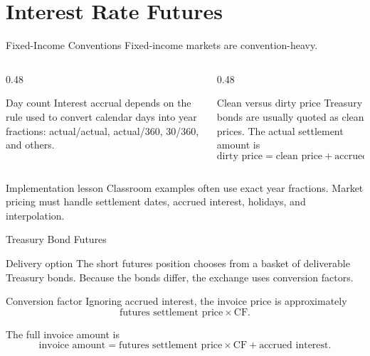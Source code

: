 \documentclass[aspectratio=169,11pt]{beamer}
\newcommand{\CF}{\mathrm{CF}}
\begin{document}
\section{Interest Rate Futures}

\begin{frame}{Fixed-Income Conventions}
    Fixed-income markets are convention-heavy.

    \begin{columns}[T]
        \begin{column}{0.48\textwidth}
            \begin{block}{Day count}
                Interest accrual depends on the rule used to convert calendar days into year fractions:
                actual/actual, actual/360, 30/360, and others.
            \end{block}
        \end{column}
        \begin{column}{0.48\textwidth}
            \begin{block}{Clean versus dirty price}
                Treasury bonds are usually quoted as clean prices.
                The actual settlement amount is
                \[
                    \text{dirty price}=\text{clean price}+\text{accrued interest}.
                \]
            \end{block}
        \end{column}
    \end{columns}

    \begin{alertblock}{Implementation lesson}
        Classroom examples often use exact year fractions. Market pricing must handle settlement dates, accrued interest, holidays, and interpolation.
    \end{alertblock}
\end{frame}

\begin{frame}{Treasury Bond Futures}
    \begin{block}{Delivery option}
        The short futures position chooses from a basket of deliverable Treasury bonds.
        Because the bonds differ, the exchange uses conversion factors.
    \end{block}

    \begin{block}{Conversion factor}
        Ignoring accrued interest, the invoice price is approximately
        \[
            \text{futures settlement price}\times \CF.
        \]
    \end{block}

    The full invoice amount is
    \[
        \text{invoice amount}
        =
        \text{futures settlement price}\times \CF
        +\text{accrued interest}.
    \]
\end{frame}
\end{document}

